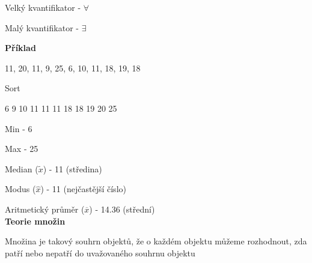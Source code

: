 \documentclass[a4paper,12pt]{article}
\begin{document}
\begin{table}[h]
	\centering
\end{table}

Velký kvantifikator - $\forall$

Malý kvantifikator - $\exists$

\newpage
\textbf{Příklad}

11, 20, 11, 9, 25, 6, 10, 11, 18, 19, 18

Sort

6  9 10 11 11 11 18 18 19 20 25

Min - 6

Max - 25

Median ($\tilde{x}$) - 11 (středina)

Modus ($\hat{x}$) - 11 (nejčastější číslo)

Aritmetický průměr ($\overline{x}$) - 14.36 (střední) \\

\textbf{Teorie množin}

Množina je takový souhrn objektů, že o 
každém objektu můžeme rozhodnout, zda patří nebo 
nepatří do uvažovaného souhrnu objektu \\
\end{document}
